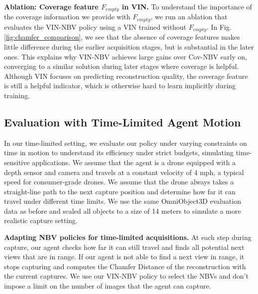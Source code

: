 \noindent\textbf{Ablation: Coverage feature $F_{empty}$ in VIN.} To understand the importance of the coverage information we provide with $F_{empty}$, we run an ablation that evaluates the VIN-NBV policy using a VIN trained without $F_{empty}$. In Fig. \ref{fig:chamfer_comparison}, we see that the absence of coverage features makes little difference during the earlier acquisition stages, but is substantial in the later ones. This explains why VIN-NBV achieves large gains over Cov-NBV early on, converging to a similar solution during later stages where coverage is helpful. Although VIN focuses on predicting reconstruction quality, the coverage feature is still a helpful indicator,  which is otherwise hard to learn implicitly during training.

\subsection{Evaluation with Time-Limited Agent Motion}
\label{limited_time_results}
\vspace{-0.25em}

In our time-limited setting, we evaluate our policy under varying constraints on time in motion to understand its efficiency under strict budgets, simulating time-sensitive applications. We assume that the agent is a drone equipped with a depth sensor and camera and travels at a constant velocity of 4 mph, a typical speed for consumer-grade drones. We assume that the drone always takes a straight-line path to the next capture position and determine how far it can travel under different time limits. We use the same OmniObject3D \cite{wu2023omniobject3d} evaluation data as before and scaled all objects to a size of 14 meters to simulate a more realistic capture setting.

\noindent\textbf{Adapting NBV policies for time-limited acquisitions.} At each step during capture, our agent checks how far it can still travel and finds all potential next views that are in range. If our agent is not able to find a next view in range, it stops capturing and computes the Chamfer Distance of the reconstruction with the current captures. We use our VIN-NBV policy to select the NBVs and don't impose a limit on the number of images that the agent can capture.

